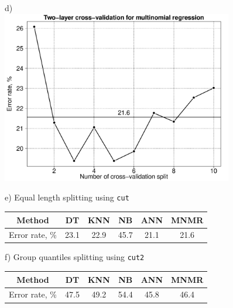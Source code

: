 \documentclass[10pt, paper=a4]{article}
\begin{document}
\begin{figure}[h!]
\begin{minipage}{0.49\textwidth}
  \end{minipage} \hfill
  \begin{minipage}{0.49\textwidth}
    d)\\
    \includegraphics[width = 0.9\textwidth]{multinomial_regression_CV1.pdf}
  \end{minipage} \vfill
  \begin{minipage}{0.49\textwidth}
    e) Equal length splitting using \verb|cut|\\
    \begin{center}
    \begin{tabular}{c|c|c|c|c|c}
      \toprule
      Method & DT & KNN & NB & ANN & MNMR\\
      \midrule
      Error rate, \% & 23.1 & 22.9 & {\color{red} 45.7} & {\color{green} 21.1} & {\color{green} 21.6}\\
      \bottomrule
    \end{tabular}
    \end{center}
  \end{minipage} \hfill
  \begin{minipage}{0.49\textwidth}
    f) Group quantiles splitting using \verb|cut2|\\
    \begin{center}
      \begin{tabular}{c|c|c|c|c|c}
        \toprule
        Method & DT & KNN & NB & ANN & MNMR\\
        \midrule
        Error rate, \% & 47.5 & 49.2 & {\color{red} 54.4} & {\color{green} 45.8} & {\color{green} 46.4}\\
        \bottomrule
      \end{tabular}
    \end{center}

\end{minipage}
\end{figure}
\end{document}
